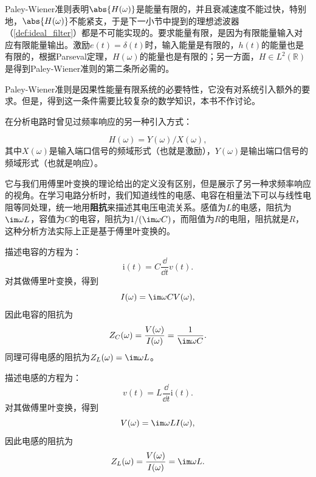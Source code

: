 Paley-Wiener准则表明$\abs{H(\omega)}$是能量有限的，并且衰减速度不能过快，特别地，$\abs{H(\omega)}$不能紧支，于是下一小节中提到的理想滤波器（\cref{def:ideal_filter}）都是不可能实现的。要求能量有限，是因为有限能量输入对应有限能量输出。激励$e(t)=\delta(t)$时，输入能量是有限的，$h(t)$的能量也是有限的，根据Parseval定理，$H(\omega)$的能量也是有限的；另一方面，$H\in L^2(\mathbb{R})$是得到Paley-Wiener准则的第二条所必需的。

Paley-Wiener准则是因果性能量有限系统的必要特性，它没有对系统引入额外的要求。但是，得到这一条件需要比较复杂的数学知识，本书不作讨论。

在分析电路时曾见过频率响应的另一种引入方式\cite{electronic_circuits}：
\begin{definition}[频率响应]
    \begin{equation}
        H(\omega)=Y(\omega)/X(\omega),
    \end{equation}
    其中$X(\omega)$是输入端口信号的频域形式（也就是激励），$Y(\omega)$是输出端口信号的频域形式（也就是响应）。
\end{definition}
它与我们用傅里叶变换的理论给出的定义没有区别，但是展示了另一种求频率响应的视角。在学习电路分析时，我们知道线性的电感、电容在相量法下可以与线性电阻等同处理，统一地用\textbf{阻抗}来描述其电压电流关系。感值为$L$的电感，阻抗为$\im\omega L$，容值为$C$的电容，阻抗为$1/(\im\omega C)$，而阻值为$R$的电阻，阻抗就是$R$，这种分析方法实际上正是基于傅里叶变换的。
\begin{example}
    描述电容的方程为：
    \begin{equation}
        \mathrm{i}(t)=C\frac{\dd}{\dd t}v(t).
    \end{equation}
    对其做傅里叶变换，得到
    \begin{equation}
        I(\omega)=\im\omega C V(\omega),
    \end{equation}
    因此电容的阻抗为
    \begin{equation}
        Z_C(\omega)=\frac{V(\omega)}{I(\omega)}=\frac{1}{\im\omega C}.
    \end{equation}
    同理可得电感的阻抗为$Z_L(\omega)=\im\omega L$。
\end{example}
\begin{example}
    描述电感的方程为：
    \begin{equation}
        v(t)=L\frac{\dd}{\dd t}\mathrm{i}(t).
    \end{equation}
    对其做傅里叶变换，得到
    \begin{equation}
        V(\omega)=\im\omega L I(\omega),
    \end{equation}
    因此电感的阻抗为
    \begin{equation}
        Z_L(\omega)=\frac{V(\omega)}{I(\omega)}=\im\omega L.
    \end{equation}
\end{example}

